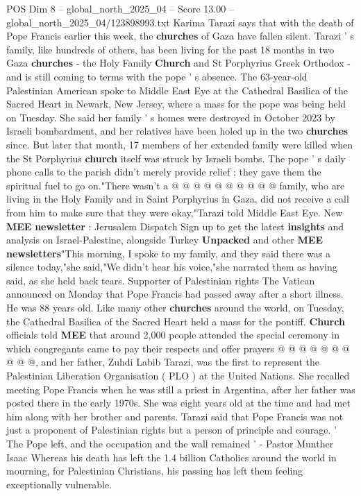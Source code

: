 \begin{textsample}{POS Dim 8 – global\_north\_2025\_04 – Score 13.00 – global\_north\_2025\_04/123898993.txt}  \label{ex:f8_pos_028}
Karima Tarazi says that with the death of Pope Francis earlier this week, the \textbf{churches} of Gaza have fallen silent.
Tarazi ' s family, like hundreds of others, has been living for the past 18 months in two Gaza \textbf{churches} - the Holy Family \textbf{Church} and St Porphyrius Greek Orthodox - and is still coming to terms with the pope ' s absence.
The 63-year-old Palestinian American spoke to Middle East Eye at the Cathedral Basilica of the Sacred Heart in Newark, New Jersey, where a mass for the pope was being held on Tuesday.
She said her family ' s homes were destroyed in October 2023 by Israeli bombardment, and her relatives have been holed up in the two \textbf{churches} since.
But later that month, 17 members of her extended family were killed when the St Porphyrius \textbf{church} itself was struck by Israeli bombs.
The pope ' s daily phone calls to the parish didn't merely provide relief ; they gave them the spiritual fuel to go on."There wasn't a @ @ @ @ @ @ @ @ @ @ family, who are living in the Holy Family and in Saint Porphyrius in Gaza, did not receive a call from him to make sure that they were okay,"Tarazi told Middle East Eye.
New \textbf{MEE} \textbf{newsletter} : Jerusalem Dispatch Sign up to get the latest \textbf{insights} and analysis on Israel-Palestine, alongside Turkey \textbf{Unpacked} and other \textbf{MEE} \textbf{newsletters}"This morning, I spoke to my family, and they said there was a silence today,"she said,"We didn't hear his voice,"she narrated them as having said, as she held back tears.
Supporter of Palestinian rights The Vatican announced on Monday that Pope Francis had passed away after a short illness.
He was 88 years old.
Like many other \textbf{churches} around the world, on Tuesday, the Cathedral Basilica of the Sacred Heart held a mass for the pontiff. \textbf{Church} officials told \textbf{MEE} that around 2,000 people attended the special ceremony in which congregants came to pay their respects and offer prayers @ @ @ @ @ @ @ @ @ @, and her father, Zuhdi Labib Tarazi, was the first to represent the Palestinian Liberation Organisation ( PLO ) at the United Nations.
She recalled meeting Pope Francis when he was still a priest in Argentina, after her father was posted there in the early 1970s.
She was eight years old at the time and had met him along with her brother and parents.
Tarazi said that Pope Francis was not just a proponent of Palestinian rights but a person of principle and courage. ' The Pope left, and the occupation and the wall remained ' - Pastor Munther Isaac Whereas his death has left the 1.4 billion Catholics around the world in mourning, for Palestinian Christians, his passing has left them feeling exceptionally vulnerable.

\end{textsample}
